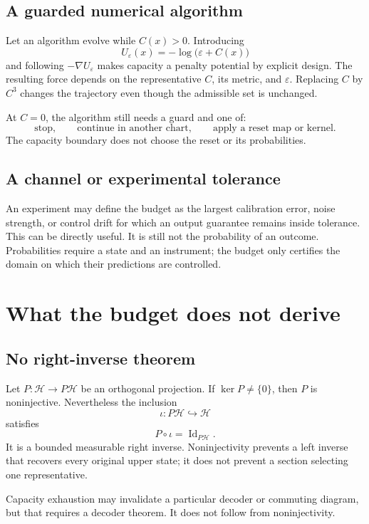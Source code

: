 \documentclass[11pt]{article}
\theoremstyle{definition}
\theoremstyle{remark}
\newcommand{\cH}{\mathcal H}
\newcommand{\Id}{\operatorname{Id}}
\begin{document}
\subsection{A guarded numerical algorithm}

Let an algorithm evolve while \(C(x)>0\).  Introducing
\[
 U_\varepsilon(x)=-\log\bigl(\varepsilon+C(x)\bigr)
\]
and following \(-\nabla U_\varepsilon\) makes capacity a penalty potential
by explicit design.  The resulting force depends on the representative
\(C\), its metric, and \(\varepsilon\).  Replacing \(C\) by \(C^3\) changes
the trajectory even though the admissible set is unchanged.

At \(C=0\), the algorithm still needs a guard and one of:
\[
 \text{stop},\qquad
 \text{continue in another chart},\qquad
 \text{apply a reset map or kernel}.
\]
The capacity boundary does not choose the reset or its probabilities.

\subsection{A channel or experimental tolerance}

An experiment may define the budget as the largest calibration error,
noise strength, or control drift for which an output guarantee remains
inside tolerance.  This can be directly useful.  It is still not the
probability of an outcome.  Probabilities require a state and an
instrument; the budget only certifies the domain on which their predictions
are controlled.

\section{What the budget does not derive}
\label{sec:limits}

\subsection{No right-inverse theorem}

Let \(P:\cH\to P\cH\) be an orthogonal projection.  If
\(\ker P\ne\{0\}\), then \(P\) is noninjective.  Nevertheless the inclusion
\[
 \iota:P\cH\hookrightarrow\cH
\]
satisfies
\[
 P\circ\iota=\Id_{P\cH}.
\]
It is a bounded measurable right inverse.  Noninjectivity prevents a left
inverse that recovers every original upper state; it does not prevent a
section selecting one representative.

Capacity exhaustion may invalidate a particular decoder or commuting
diagram, but that requires a decoder theorem.  It does not follow from
noninjectivity.
\end{document}
